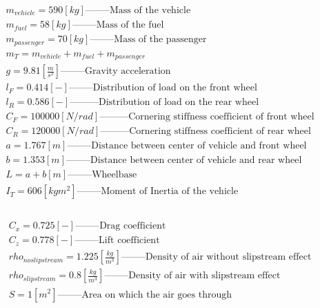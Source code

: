 \documentclass{report}
\begin{document}
\begin{equation*}
\begin{aligned}
m_{vehicle} = 590 [kg] \text{--------Mass of the vehicle}\\
m_{fuel} = 58 [kg] \text{--------Mass of the fuel}\\
m_{passenger} = 70 [kg] \text{--------Mass of the passenger}\\
m_T = m_{vehicle} + m_{fuel}+ m_{passenger} \\
g = 9.81 [\frac{m}{s^2}] \text{--------Gravity acceleration}\\
l_F = 0.414 [-] \text{--------Distribution of load on the front wheel}\\
l_R = 0.586 [-] \text{---------Distribution of load on the rear wheel}\\
C_F = 100000 [N/rad] \text{---------Cornering stiffness coefficient of front wheel}\\ 
C_R = 120000 [N/rad] \text{---------Cornering stiffness coefficient of rear wheel}\\ 
a = 1.767 [m] \text{--------Distance between center of vehicle and front wheel}\\
b = 1.353 [m] \text{--------Distance between center of vehicle and rear wheel}\\
L = a + b [m] \text{--------Wheelbase}\\
I_T = 606 [kg m^2] \text{--------Moment of Inertia of the vehicle}\\\\
\end{aligned}
\end{equation*}

\begin{equation*}
\begin{aligned}
C_x = 0.725 [-] \text{--------Drag coefficient}\\
C_z = 0.778 [-] \text{--------Lift coefficient}\\
rho_{noslipstream} = 1.225 [\frac{kg}{m^3}] \text{--------Density of air without slipstream effect}\\
rho_{slipstream} = 0.8 [\frac{kg}{m^3}] \text{--------Density of air with slipstream effect}\\
S = 1 [m^2] \text{--------Area on which the air goes through}\\\\
\end{aligned}
\end{equation*}
\end{document}

